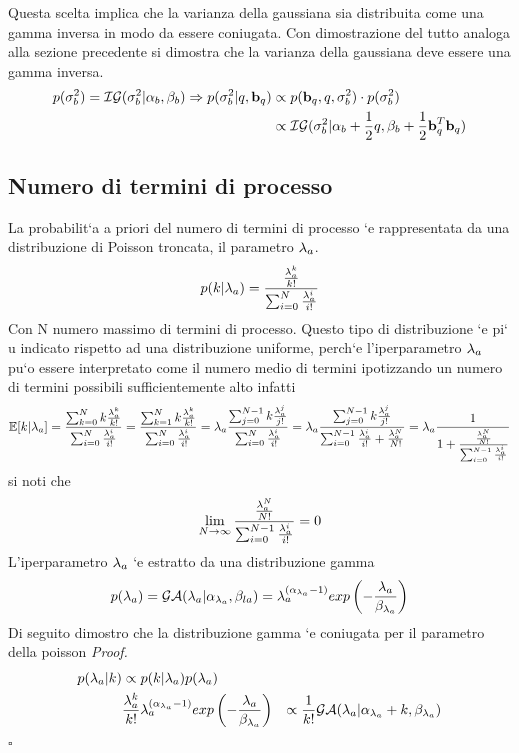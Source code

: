 Questa scelta implica che la varianza della gaussiana sia distribuita come una gamma
inversa in modo da essere coniugata. Con dimostrazione del tutto analoga alla
sezione precedente si dimostra che la varianza della gaussiana deve essere una gamma
inversa.
\begin{align*}
p(\sigma_b^2)=\mathcal{I}\mathcal{G}(\sigma_b^2|\alpha_b,\beta_b)\Rightarrow
p(\sigma_b^2|q,\textbf{b}_q) & \propto p(\textbf{b}_q,q,\sigma_b^2)\cdot p(\sigma_b^2)\\
	 &\propto \mathcal{I}\mathcal{G}(\sigma_b^2|\alpha_b+\frac{1}{2}q,\beta_b+\frac{1}{2}\textbf{b}_q^T\textbf{b}_q)	
\end{align*}

\subsection*{Numero di termini di processo}
La probabilit`a a priori del numero di termini di processo `e rappresentata da una
distribuzione di Poisson troncata, il parametro $\lambda_a$.
\begin{equation}
p(k|\lambda_a)=\frac{\frac{\lambda_a^k}{k!}}{\sum_{i=0}^N\frac{\lambda_a^i}{i!}}
\end{equation}
Con N numero massimo di termini di processo.
Questo tipo di distribuzione `e pi`
u indicato rispetto ad una distribuzione uniforme,
perch`e l’iperparametro $\lambda_a$ pu`o essere interpretato come il numero medio di termini
ipotizzando un numero di termini possibili sufficientemente alto infatti
\begin{equation}
\mathbb{E}[k|\lambda_a]=\frac{\sum_{k=0}^Nk\frac{\lambda_a^k}{k!}}{\sum_{i=0}^N\frac{\lambda_a^i}{i!}}=\frac{\sum_{k=1}^Nk\frac{\lambda_a^k}{k!}}{\sum_{i=0}^N\frac{\lambda_a^i}{i!}}=\lambda_a\frac{\sum_{j=0}^{N-1}k\frac{\lambda_a^j}{j!}}{\sum_{i=0}^N\frac{\lambda_a^i}{i!}}=
\lambda_a\frac{\sum_{j=0}^{N-1}k\frac{\lambda_a^j}{j!}}{\sum_{i=0}^{N-1}\frac{\lambda_a^i}{i!}+\frac{\lambda_a^N}{N!}}=\lambda_a\frac{1}{1+\frac{\frac{\lambda_a^N}{N!}}{\sum_{i=0}^{N-1}\frac{\lambda_a^i}{i!}}}
\end{equation}
si noti che
\begin{equation}
\lim_{N\rightarrow\infty}\frac{\frac{\lambda_a^N}{N!}}{\sum_{i=0}^{N-1}\frac{\lambda_a^i}{i!}}=0
\end{equation}
L’iperparametro $\lambda_a$ `e estratto da una distribuzione gamma
\begin{equation}
p(\lambda_a)=\mathcal{G}\mathcal{A}(\lambda_a|\alpha_{\lambda_a},\beta_{la})=\lambda_a^{(\alpha_{\lambda_a}-1)}exp\left(-\frac{\lambda_a}{\beta_{\lambda_a}}\right)
\end{equation}
Di seguito dimostro che la distribuzione gamma `e coniugata per il parametro della
poisson
\textit{Proof.}
\begin{align*}
p(\lambda_a|k)&\propto p(k|\lambda_a)p(\lambda_a)\\
&\frac{\lambda_a^k}{k!}\lambda_a^{(\alpha_{\lambda_a}-1)}exp\left(-\frac{\lambda_a}{\beta_{\lambda_a}}\right)
&\propto\frac{1}{k!}\mathcal{G}\mathcal{A}(\lambda_a|\alpha_{\lambda_a}+k,\beta_{\lambda_a})
\end{align*}
 \begin{flushright}
 $\square$
 \end{flushright}
